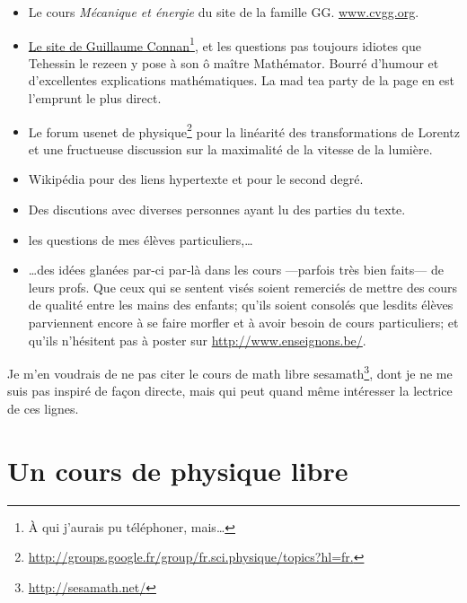 \begin{itemize}
	\item
		Le cours \emph{Mécanique et énergie} du \og site de la famille GG\fg. \href{www.cvgg.org}{www.cvgg.org}.
	\item 
		\href{http://gconnan.free.fr/}{Le site de Guillaume Connan}\footnote{À qui j'aurais pu téléphoner, mais\ldots}, et les questions pas toujours idiotes que Tehessin le rezeen y pose à son ô maître Mathémator. Bourré d'humour et d'excellentes explications mathématiques. La mad tea party de la page \pageref{PgMadTeaParty} en est l'emprunt le plus direct.
	\item 
		Le forum usenet de physique\footnote{\href{http://groups.google.fr/group/fr.sci.physique/topics?hl=fr.}{http://groups.google.fr/group/fr.sci.physique/topics?hl=fr.}} pour la linéarité des transformations de Lorentz et une fructueuse discussion sur la maximalité de la vitesse de la lumière. 
	\item 
		Wikipédia pour des liens hypertexte et pour le second degré.
	\item 
		Des discutions avec diverses personnes ayant lu des parties du texte.
	\item 
		les questions de mes élèves particuliers,\ldots
	\item 
		\ldots des idées glanées par-ci par-là dans les cours ---parfois très bien faits--- de leurs profs. Que ceux qui se sentent visés soient remerciés de mettre des cours de qualité entre les mains des enfants; qu'ils soient consolés que lesdits élèves parviennent encore à se faire morfler et à avoir besoin de cours particuliers; et qu'ils n'hésitent pas à poster sur \href{http://www.enseignons.be/}{http://www.enseignons.be/}.
\end{itemize}

Je m'en voudrais de ne pas citer le cours de math libre sesamath\footnote{\href{http://manuel.sesamath.net/}{http://sesamath.net/}}, dont je ne me suis pas inspiré de façon directe, mais qui peut quand même intéresser la lectrice de ces lignes.


					\section{Un cours de physique libre}

